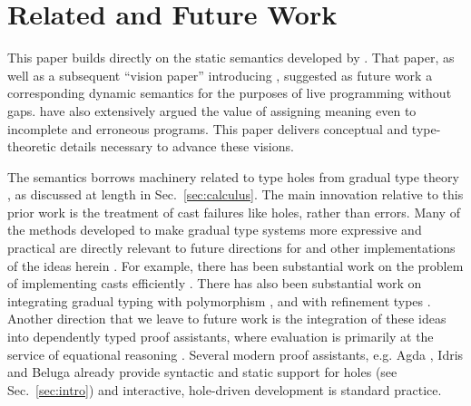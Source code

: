 \vspace{-5px}
\newcommand{\relatedWorkSection}{Related and Future Work}
\section{\protect\relatedWorkSection} %
\label{sec:relatedWork}
\vspace{-2px}

This paper builds directly on the static semantics developed by \citet{popl-paper}. That paper, as well as a subsequent ``vision paper'' introducing \Hazel \cite{HazelnutSNAPL}, suggested as future work  
a corresponding dynamic semantics for the purposes of live programming without gaps. \citet{Bayne:2011:ASD:1985793.1985864} have also extensively argued the value of assigning meaning even to incomplete and erroneous programs. 
This paper delivers conceptual and type-theoretic details necessary to advance these visions.


The semantics borrows machinery related to type holes from gradual type theory \cite{Siek06a,DBLP:conf/snapl/SiekVCB15}, as discussed
at length in Sec.~\ref{sec:calculus}. The main innovation relative to this
prior work is the treatment of cast failures like holes, rather than errors.
Many of the methods developed to make gradual type systems more expressive and practical are directly relevant to future directions for \Hazel and other implementations of the ideas herein \cite{takikawa_et_al:LIPIcs:2015:5215}. For example, there has been substantial work on the problem of implementing casts efficiently \cite{herman2010space,siek2010threesomes,garcia2013threesomes}. There has also been substantial work on integrating gradual typing with polymorphism \cite{DBLP:conf/esop/XieBO18,DBLP:journals/pacmpl/DevriesePP18,Igarashi:2017:PGT:3136534.3110284}, and with refinement types \cite{DBLP:conf/popl/LehmannT17}. Another direction that we leave to future work is the integration of these ideas into dependently typed proof assistants, 
where evaluation is primarily at the service of equational reasoning \cite{DBLP:journals/corr/abs-1009-2789}. Several modern proof assistants, e.g. Agda \cite{norell2009dependently,norell:thesis}, Idris \cite{brady2013idris} and Beluga \cite{DBLP:conf/flops/Pientka10} already provide syntactic and static support for holes (see Sec.~\ref{sec:intro}) and interactive, hole-driven development is standard practice.

